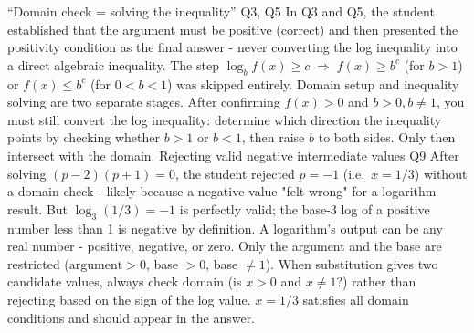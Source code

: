 \documentclass[11pt,a4paper]{article}
\begin{document}
\begin{tsMisconceptions}
    \tsMisconception%
        {``Domain check = solving the inequality''}%
        {Q3, Q5}%
        {In Q3 and Q5, the student established that the argument must be positive (correct) and then presented the positivity condition as the final answer - never converting the log inequality into a direct algebraic inequality. The step $\log_{b} f(x) \geq c \;\Rightarrow\; f(x) \geq b^{c}$ (for $b>1$) or $f(x) \leq b^{c}$ (for $0<b<1$) was skipped entirely.}%
        {Domain setup and inequality solving are two separate stages. After confirming $f(x)>0$ and $b>0, b\neq 1$, you must still convert the log inequality: determine which direction the inequality points by checking whether $b>1$ or $b<1$, then raise $b$ to both sides. Only then intersect with the domain.}
    \tsMisconception%
        {Rejecting valid negative intermediate values}%
        {Q9}%
        {After solving $(p-2)(p+1)=0$, the student rejected $p=-1$ (i.e.\ $x=1/3$) without a domain check - likely because a negative value "felt wrong" for a logarithm result. But $\log_{3}(1/3) = -1$ is perfectly valid; the base-3 log of a positive number less than 1 is negative by definition.}%
        {A logarithm's output can be any real number - positive, negative, or zero. Only the argument and the base are restricted ($\text{argument}>0$, base $>0$, base $\neq 1$). When substitution gives two candidate values, always check domain (is $x>0$ and $x\neq 1$?) rather than rejecting based on the sign of the log value. $x=1/3$ satisfies all domain conditions and should appear in the answer.}
\end{tsMisconceptions}

\newpage
{}
\end{document}
